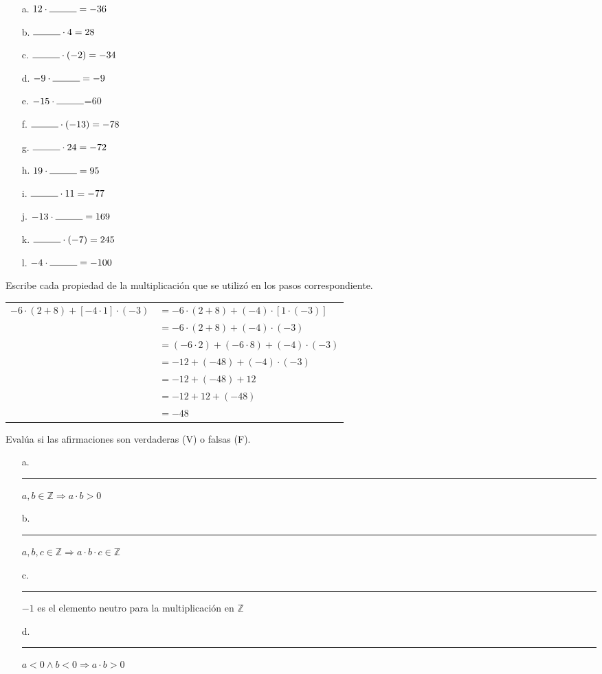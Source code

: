 \documentclass[spanish,letterpaper, 11pt, addpoints, answers]{exam}
\begin{document}
\begin{questions}
\begin{multicols}{2}
 
    \begin{itemize}
      \item[a.] $12\cdot \rule{1cm}{0.4pt}=-36$
      \item[b.] $\rule{1cm}{0.4pt}\cdot 4=28$
      \item[c.] $\rule{1cm}{0.4pt}\cdot (-2)=-34$
      \item[d.] $-9\cdot \rule{1cm}{0.4pt}=-9$
      \item[e.] $-15\cdot \rule{1cm}{0.4pt}$=60
      \item[f.] $\rule{1cm}{0.4pt}\cdot (-13)=-78$
      \item[g.] $\rule{1cm}{0.4pt}\cdot 24=-72$
      \item[h.] $19\cdot \rule{1cm}{0.4pt}=95$
      \item[i.] $\rule{1cm}{0.4pt}\cdot 11=-77$
      \item[j.] $-13\cdot \rule{1cm}{0.4pt}=169$
      \item[k.] $\rule{1cm}{0.4pt}\cdot (-7)=245$
      \item[l.] $-4\cdot \rule{1cm}{0.4pt}=-100$
       
    \end{itemize}
   \end{multicols}

\question Escribe cada propiedad de la multiplicación que se utilizó en los pasos correspondiente.

\begin{center}
\begin{tabular}{rl}
  $-6\cdot (2+8)+[-4\cdot 1]\cdot (-3)$&$=-6\cdot (2+8)+(-4)\cdot [1\cdot (-3)]$\\
  &$=-6\cdot (2+8)+(-4)\cdot (-3)$\\
  &$=(-6\cdot 2)+(-6\cdot 8)+(-4)\cdot (-3)$\\
  &$=-12+(-48)+(-4)\cdot (-3)$\\
  &$=-12+(-48)+12$\\
  &$=-12+12+(-48)$\\
  &$=-48$\\
\end{tabular}
\end{center}

\question Evalúa si las afirmaciones son verdaderas (V) o falsas (F).

\begin{itemize}
  \item[a.] \rule{1cm}{0.4pt} $a,b\in \mathbb{Z}\Rightarrow a\cdot b>0$ 
  \item[b.] \rule{1cm}{0.4pt} $a,b,c\in \mathbb{Z}\Rightarrow a\cdot b\cdot c \in \mathbb{Z}$ 
  \item[c.] \rule{1cm}{0.4pt} $-1$ es el elemento neutro para la multiplicación en $\mathbb{Z}$ 
  \item[d.] \rule{1cm}{0.4pt} $a<0 \wedge b<0\Rightarrow a\cdot b>0$ 
\end{itemize}


\end{questions}
\end{document}
